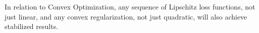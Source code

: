 \documentclass[11pt]{article}
\begin{document}
In relation to Convex Optimization, any sequence of Lipschitz loss functions, not just linear, and any convex regularization, not just quadratic, will also achieve stabilized results.
% 
% 



\end{document}
